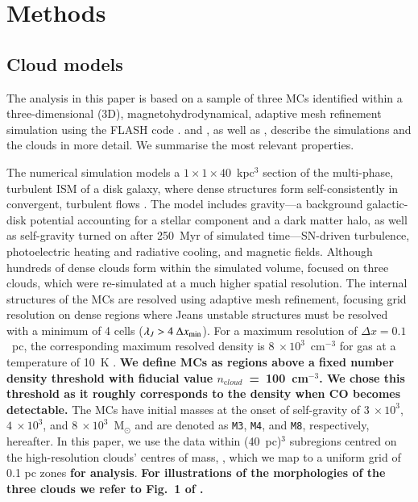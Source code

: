 \section{Methods}\label{methods}


\subsection{Cloud models}\label{methods:clouds}

The analysis in this paper is based on a sample of three MCs identified within a three-dimensional (3D), magnetohydrodynamical, adaptive mesh refinement simulation using the FLASH code \citep{Fryxell2000}.  
 and , as well as \citet[ hereafter]{Chira2018}, describe the simulations and the clouds in more detail. 
We summarise the most relevant properties. 

The numerical simulation models a $1\times1\times40$~kpc$^3$ section of the multi-phase, turbulent ISM of a disk galaxy, where dense structures form self-consistently in convergent, turbulent flows .  
The model includes gravity---a background galactic-disk potential accounting for a stellar component and a dark matter halo, as well as self-gravity turned on after 250~Myr of simulated time---SN-driven turbulence, photoelectric heating and radiative cooling, and magnetic fields. 
Although hundreds of dense clouds form within the simulated volume,  focused on three clouds, which were re-simulated at a much higher spatial resolution.
The internal structures of the MCs are resolved using adaptive mesh refinement, focusing grid resolution on dense regions where Jeans unstable structures must be resolved with a minimum of 4 cells ($\lambda_J > 4~\Delta x_{\rm min}$).
For a maximum resolution of $\Delta x = 0.1$~pc, the corresponding maximum resolved density is $8~\times 10^3$~cm$^{-3}$ for gas at a temperature of 10~K . {\bf We define MCs as regions above a fixed number density threshold with fiducial value $n_{\mathrm cloud}$~=~100~cm$^{-3}$.  We chose this threshold as it roughly corresponds to the density when CO becomes detectable.}
The MCs have initial masses at the onset of self-gravity of $3~\times 10^3$, $4~\times 10^3$, and $8~\times 10^3$~M$_{\odot}$ and are denoted as \texttt{M3}, \texttt{M4}, and \texttt{M8}, respectively, hereafter. In this paper, we use the data within (40~pc)$^{3}$ subregions centred on the high-resolution clouds' centres of mass, , which we map to a uniform grid of 0.1 pc zones \textbf{for analysis}.
\textbf{
    For illustrations of the morphologies of the three clouds we refer to Fig.~1 of .
}

